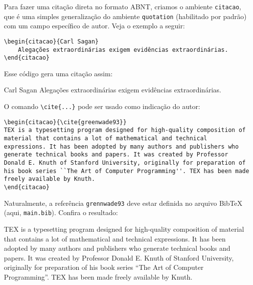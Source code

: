 Para fazer uma citação direta no formato ABNT, criamos o ambiente \verb|citacao|, que é uma simples generalização do ambiente \verb|quotation| (habilitado por padrão) com um campo específico de autor. Veja o exemplo a seguir:
\begin{verbatim}
\begin{citacao}{Carl Sagan}
    Alegações extraordinárias exigem evidências extraordinárias.
\end{citacao}
\end{verbatim}
Esse código gera uma citação assim:
\begin{citacao}{Carl Sagan}
    Alegações extraordinárias exigem evidências extraordinárias.
\end{citacao}
O comando \verb|\cite{...}| pode ser usado como indicação do autor:
\begin{verbatim}
\begin{citacao}{\cite{greenwade93}}
TEX is a typesetting program designed for high-quality composition of material that contains a lot of mathematical and technical expressions. It has been adopted by many authors and publishers who generate technical books and papers. It was created by Professor Donald E. Knuth of Stanford University, originally for preparation of his book series ``The Art of Computer Programming''. TEX has been made freely available by Knuth.
\end{citacao}
\end{verbatim}
Naturalmente, a referência \verb|grennwade93| deve estar definida no arquivo BibTeX (aqui, \verb|main.bib|). Confira o resultado:
\begin{citacao}{\cite{greenwade93}}
TEX is a typesetting program designed for high-quality composition of material that contains a lot of mathematical and technical expressions. It has been adopted by many authors and publishers who generate technical books and papers. It was created by Professor Donald E. Knuth of Stanford University, originally for preparation of his book series ``The Art of Computer Programming''. TEX has been made freely available by Knuth.
\end{citacao}


